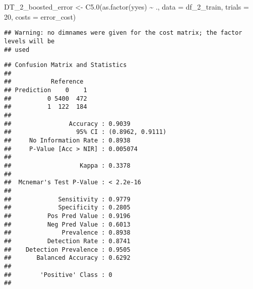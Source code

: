 \documentclass[
]{article}
\newenvironment{Shaded}{\begin{snugshade}}{\end{snugshade}}
\newcommand{\AttributeTok}[1]{\textcolor[rgb]{0.77,0.63,0.00}{#1}}
\newcommand{\CommentTok}[1]{\textcolor[rgb]{0.56,0.35,0.01}{\textit{#1}}}
\newcommand{\DecValTok}[1]{\textcolor[rgb]{0.00,0.00,0.81}{#1}}
\newcommand{\FunctionTok}[1]{\textcolor[rgb]{0.00,0.00,0.00}{#1}}
\newcommand{\NormalTok}[1]{#1}
\newcommand{\OtherTok}[1]{\textcolor[rgb]{0.56,0.35,0.01}{#1}}
\newcommand{\SpecialCharTok}[1]{\textcolor[rgb]{0.00,0.00,0.00}{#1}}
\begin{document}
\begin{Shaded}
\begin{Highlighting}[]
\NormalTok{DT\_2\_boosted\_error }\OtherTok{\textless{}{-}} \FunctionTok{C5.0}\NormalTok{(}\FunctionTok{as.factor}\NormalTok{(yyes) }\SpecialCharTok{\textasciitilde{}}\NormalTok{ ., }\AttributeTok{data =}\NormalTok{ df\_2\_train, }\AttributeTok{trials =} \DecValTok{20}\NormalTok{, }\AttributeTok{costs =}\NormalTok{ error\_cost)}
\end{Highlighting}
\end{Shaded}

\begin{verbatim}
## Warning: no dimnames were given for the cost matrix; the factor levels will be
## used
\end{verbatim}

\begin{Shaded}
\end{Shaded}

\begin{verbatim}
## Confusion Matrix and Statistics
## 
##           Reference
## Prediction    0    1
##          0 5400  472
##          1  122  184
##                                           
##                Accuracy : 0.9039          
##                  95% CI : (0.8962, 0.9111)
##     No Information Rate : 0.8938          
##     P-Value [Acc > NIR] : 0.005074        
##                                           
##                   Kappa : 0.3378          
##                                           
##  Mcnemar's Test P-Value : < 2.2e-16       
##                                           
##             Sensitivity : 0.9779          
##             Specificity : 0.2805          
##          Pos Pred Value : 0.9196          
##          Neg Pred Value : 0.6013          
##              Prevalence : 0.8938          
##          Detection Rate : 0.8741          
##    Detection Prevalence : 0.9505          
##       Balanced Accuracy : 0.6292          
##                                           
##        'Positive' Class : 0               
## 
\end{verbatim}
\end{document}
